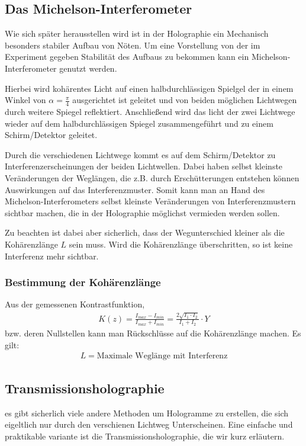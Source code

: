 \subsection{Das Michelson-Interferometer}
Wie sich später herausstellen wird ist in der Holographie ein Mechanisch besonders stabiler Aufbau von Nöten. Um eine Vorstellung von der im Experiment gegeben Stabilität des Aufbaus zu bekommen kann ein Michelson-Interferometer genutzt werden. 

Hierbei wird kohärentes Licht auf einen halbdurchlässigen Spielgel der in einem Winkel von $\alpha = \frac{\pi}{4}$ ausgerichtet ist geleitet und von beiden möglichen Lichtwegen durch weitere Spiegel reflektiert. Anschließend wird das licht der zwei Lichtwege wieder auf dem halbdurchlässigen Spiegel zusammengeführt und zu einem Schirm/Detektor geleitet.


Durch die verschiedenen Lichtwege kommt es auf dem Schirm/Detektor zu Interferenzerscheinungen der beiden Lichtwellen. Dabei haben selbst kleinste Veränderungen der Weglängen, die z.B. durch Erschütterungen entstehen können Auswirkungen auf das Interferenzmuster. Somit kann man an Hand des Michelson-Interferometers selbst kleinste Veränderungen von Interferenzmustern sichtbar machen, die in der Holographie möglichst vermieden werden sollen.

Zu beachten ist dabei aber sicherlich, dass der Wegunterschied kleiner als die Kohärenzlänge $L$ sein muss. Wird die Kohärenzlänge überschritten, so ist keine Interferenz mehr sichtbar.
\subsubsection{Bestimmung der Kohärenzlänge}
Aus der gemessenen Kontrastfunktion,
\begin{align}
K(z) = \frac{I_{max}-I_{min}}{I_{max}+I_{min}} = \frac{2\sqrt{I_1 \cdot I_2}}{I_1+I_2} \cdot Y
\end{align}
bzw. deren Nullstellen kann man Rückschlüsse auf die Kohärenzlänge machen. Es gilt:
\begin{align}
L = \text{Maximale Weglänge mit Interferenz}
\end{align}

\subsection{Transmissionsholographie}
es gibt sicherlich viele andere Methoden um Hologramme zu erstellen, die sich eigeltlich nur durch den verschienen Lichtweg Unterscheinen. Eine einfache und praktikable variante ist die Transmissionsholographie, die wir kurz erläutern.
